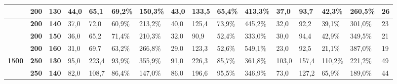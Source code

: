 \documentclass[conference,compsoc]{IEEEtran}
\begin{document}
\begin{adjustbox}{angle=90,width={\textwidth},totalheight={22cm},keepaspectratio,caption={Tabela de Resultados},center={14cm}}
\begin{tabular}{|l|l|l|l|l|l|l|l|l|l|l|l|l|l|l|l|}
\textbf{}                                            & \textbf{200}                                     & \textbf{130}                                        & 44,0            & 65,1           & 69,2\%              & 150,3\%            & 43,0            & 133,5          & 65,4\%              & 413,3\%            & 37,0            & 93,7           & 42,3\%              & 260,5\%            & 26                               \\ \hline
\textbf{}                                            & \textbf{200}                                     & \textbf{140}                                        & 37,0            & 72,0           & 60,9\%              & 213,2\%            & 40,0            & 125,4          & 73,9\%              & 445,2\%            & 32,0            & 92,2           & 39,1\%              & 301,0\%            & 23                               \\ \hline
\textbf{}                                            & \textbf{200}                                     & \textbf{150}                                        & 36,0            & 65,2           & 71,4\%              & 210,3\%            & 32,0            & 90,9           & 52,4\%              & 333,0\%            & 30,0            & 94,4           & 42,9\%              & 349,5\%            & 21                               \\ \hline
\textbf{}                                            & \textbf{200}                                     & \textbf{160}                                        & 31,0            & 69,7           & 63,2\%              & 266,8\%            & 29,0            & 123,3          & 52,6\%              & 549,1\%            & 23,0            & 92,5           & 21,1\%              & 387,0\%            & 19                               \\ \hline
\textbf{1500}                                        & \textbf{250}                                     & \textbf{130}                                        & 95,0            & 223,4          & 93,9\%              & 355,9\%            & 91,0            & 226,3          & 85,7\%              & 361,8\%            & 103,0           & 157,4          & 110,2\%             & 221,2\%            & 49                               \\ \hline
\textbf{}                                            & \textbf{250}                                     & \textbf{140}                                        & 82,0            & 108,7          & 86,4\%              & 147,0\%            & 86,0            & 196,6          & 95,5\%              & 346,9\%            & 73,0            & 127,2          & 65,9\%              & 189,0\%            & 44                               \\ \hline

\end{tabular}
\end{adjustbox}
\end{document}
